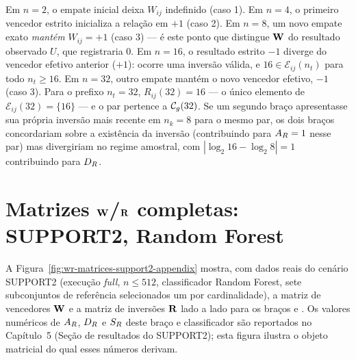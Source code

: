 Em $n=2$, o empate inicial deixa $W_{ij}$ indefinido (caso 1). Em $n=4$, o primeiro vencedor estrito inicializa a relação em $+1$ (caso 2). Em $n=8$, um novo empate exato \emph{mantém} $W_{ij}=+1$ (caso 3) --- é este ponto que distingue $\mathbf{W}$ do resultado observado $U$, que registraria $0$. Em $n=16$, o resultado estrito $-1$ diverge do vencedor efetivo anterior ($+1$): ocorre uma inversão válida, e $16\in\mathcal{E}_{ij}(n_t)$ para todo $n_t\geq16$. Em $n=32$, outro empate mantém o novo vencedor efetivo, $-1$ (caso 3). Para o prefixo $n_t=32$, $R_{ij}(32)=16$ --- o único elemento de $\mathcal{E}_{ij}(32)=\{16\}$ --- e o par pertence a $\mathcal{C}_g(32)$. Se um segundo braço apresentasse sua própria inversão mais recente em $n_k=8$ para o mesmo par, os dois braços concordariam sobre a existência da inversão (contribuindo para $A_R=1$ nesse par) mas divergiriam no regime amostral, com $\left|\log_2 16-\log_2 8\right|=1$ contribuindo para $D_R$.

\section{Matrizes \texorpdfstring{$\mathbf{W}$}{W}/\texorpdfstring{$\mathbf{R}$}{R} completas: SUPPORT2, Random Forest}

A Figura~\ref{fig:wr-matrices-support2-appendix} mostra, com dados reais do cenário SUPPORT2 (execução \textit{full}, $n\leq512$, classificador Random Forest, sete subconjuntos de referência selecionados um por cardinalidade), a matriz de vencedores $\mathbf{W}$ e a matriz de inversões $\mathbf{R}$ lado a lado para os braços \RealToReal{} e \GaussianToReal. Os valores numéricos de $A_R$, $D_R$ e $S_R$ deste braço e classificador são reportados no Capítulo~5 (Seção de resultados do SUPPORT2); esta figura ilustra o objeto matricial do qual esses números derivam.

